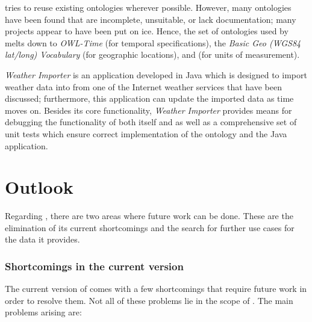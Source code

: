 \smarthomeweather tries to reuse existing ontologies wherever possible. However, many ontologies have been found that are incomplete, unsuitable, or lack documentation; many projects appear to have been put on ice. Hence, the set of ontologies used by \smarthomeweather melts down to \emph{OWL-Time} (for temporal specifications), the \emph{Basic Geo (\acs{WGS84} lat/long) Vocabulary} (for geographic locations), and \muo (for units of measurement).

\emph{Weather Importer} is an application developed in Java which is designed to import weather data into \smarthomeweather from one of the Internet weather services that have been discussed; furthermore, this application can update the imported data as time moves on. Besides its core functionality, \emph{Weather Importer} provides means for debugging the functionality of both itself and \smarthomeweather as well as a comprehensive set of unit tests which ensure correct implementation of the ontology and the Java application.

\section{Outlook}

Regarding \smarthomeweather, there are two areas where future work can be done. These are the elimination of its current shortcomings and the search for further use cases for the data it provides.

\subsubsection{Shortcomings in the current version}

The current version of \smarthomeweather comes with a few shortcomings that require future work in order to resolve them. Not all of these problems lie in the scope of \smarthomeweather. The main problems arising are:

